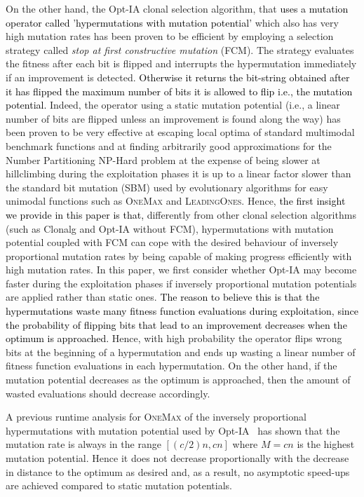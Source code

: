 \documentclass[lettersize,journal]{IEEEtran}
\newcommand{\new}[1]{\textcolor{black}{#1}}
\newcommand{\rerev}[1]{\textcolor{purple}{#1}}
\begin{document}
On the other hand, the Opt-IA clonal selection algorithm, that \new{uses a mutation operator called 'hypermutations with mutation potential'} which also has very high mutation rates has been proven to be efficient by employing a selection strategy called {\it stop at first constructive mutation} (FCM). The strategy evaluates the fitness after each bit is flipped and interrupts the hypermutation immediately if an improvement is detected. \new {Otherwise it returns the bit-string obtained after it has flipped the maximum number of  bits it is allowed to flip i.e., the mutation potential.} 
Indeed, the operator using a static mutation potential (i.e., a linear number of bits are flipped unless an improvement is found along the way) has been proven to be very effective at escaping local
optima of standard multimodal benchmark functions \cite{CorusOlivetoYazdani2019TCS} and at finding arbitrarily good approximations for the Number Partitioning NP-Hard problem \cite{CorusOlivetoYazdaniPPSN2018Approx,CorusOlivetoYazdaniAIJ2019} at the expense
of being slower at hillclimbing during the exploitation phases \rerev{\textemdash} it is up to a linear factor slower than the standard bit mutation (SBM) used by evolutionary algorithms for easy unimodal functions such as \textsc{OneMax} and \textsc{LeadingOnes}.
Hence, \new{the first insight we provide in this paper is that,} differently from other clonal selection algorithms (such as Clonalg and Opt-IA without FCM), hypermutations with mutation potential coupled with FCM can cope with the desired behaviour of inversely proportional mutation rates by being capable of making progress efficiently with high mutation rates. 
In this paper, we first consider whether Opt-IA may become faster during the exploitation phases if inversely proportional mutation potentials are applied rather than static ones.
\new{The reason to believe this is that the hypermutations waste many fitness function evaluations during exploitation, since the probability of flipping bits that lead to an improvement decreases when the optimum is approached.} 
Hence, with high probability the operator flips wrong bits at the beginning of a hypermutation and ends up wasting a linear number
of fitness function evaluations in each hypermutation. On the other hand, if the mutation potential decreases as the optimum is approached, 
then the amount of wasted evaluations should decrease accordingly.

A previous runtime analysis for \textsc{OneMax} of the inversely proportional hypermutations with mutation potential used by Opt-IA~\cite{JansenZarges2011} has shown that the mutation rate is always in the range $[(c/2)n, cn]$ where $M=cn$ is the highest mutation potential. Hence it does not decrease proportionally with the decrease in distance to the optimum as desired and, as a result, no asymptotic speed-ups are achieved compared to static mutation potentials. 
\end{document}
